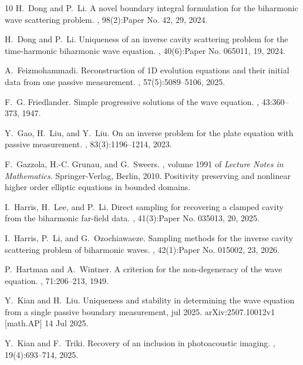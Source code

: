 \documentclass[12pt,reqno]{amsart}
\numberwithin{equation}{section}
\begin{document}
\begin{thebibliography}{10}
H.~Dong and P.~Li.
\newblock A novel boundary integral formulation for the biharmonic wave
  scattering problem.
, 98(2):Paper No. 42, 29, 2024.

H.~Dong and P.~Li.
\newblock Uniqueness of an inverse cavity scattering problem for the
  time-harmonic biharmonic wave equation.
, 40(6):Paper No. 065011, 19, 2024.

A.~Feizmohammadi.
\newblock Reconstruction of 1{D} evolution equations and their initial data
  from one passive measurement.
, 57(5):5089--5106, 2025.

F.~G. Friedlander.
\newblock Simple progressive solutions of the wave equation.
, 43:360--373, 1947.

Y.~Gao, H.~Liu, and Y.~Liu.
\newblock On an inverse problem for the plate equation with passive
  measurement.
, 83(3):1196--1214, 2023.

F.~Gazzola, H.-C. Grunau, and G.~Sweers.
, volume 1991 of {\em
  Lecture Notes in Mathematics}.
\newblock Springer-Verlag, Berlin, 2010.
\newblock Positivity preserving and nonlinear higher order elliptic equations
  in bounded domains.

I.~Harris, H.~Lee, and P.~Li.
\newblock Direct sampling for recovering a clamped cavity from the biharmonic
  far-field data.
, 41(3):Paper No. 035013, 20, 2025.

I.~Harris, P.~Li, and G.~Ozochiawaeze.
\newblock Sampling methods for the inverse cavity scattering problem of
  biharmonic waves.
, 42(1):Paper No. 015002, 23, 2026.

P.~Hartman and A.~Wintner.
\newblock A criterion for the non-degeneracy of the wave equation.
, 71:206--213, 1949.

Y.~Kian and H.~Liu.
\newblock Uniqueness and stability in determining the wave equation from a
  single passive boundary measurement, jul 2025.
\newblock arXiv:2507.10012v1 [math.AP] 14 Jul 2025.

Y.~Kian and F.~Triki.
\newblock Recovery of an inclusion in photoacoustic imaging.
, 19(4):693--714, 2025.


\end{thebibliography}
\end{document}
